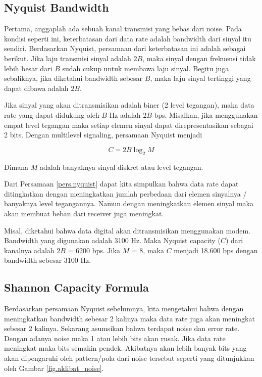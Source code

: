 \subsection{Nyquist Bandwidth}

Pertama, anggaplah ada sebuah kanal transmisi yang bebas dari noise. Pada kondisi seperti ini, keterbatasan dari data rate adalah bandwidth dari sinyal itu sendiri. Berdasarkan Nyquist, persamaan dari keterbatasan ini adalah sebagai berikut. Jika laju transmisi sinyal adalah $ 2B $, maka sinyal dengan frekuensi tidak lebih besar dari $ B $ sudah cukup untuk membawa laju sinyal. Begitu juga sebaliknya, jika diketahui bandwidth sebesar $ B $, maka laju sinyal tertinggi yang dapat dibawa adalah $ 2B $.

Jika sinyal yang akan ditransmisikan adalah biner (2 level tegangan), maka data rate yang dapat didukung oleh $ B $ Hz adalah $ 2B $ bps. Misalkan, jika menggunakan empat level tegangan maka setiap elemen sinyal dapat direpresentasikan sebagai 2 bits. Dengan multilevel signaling, persamaan Nyquist menjadi

\begin{equation} \label{pers.nyquist}
	C = 2B \log_2 M
\end{equation}

Dimana $ M $ adalah banyaknya sinyal diskret atau level tegangan.

Dari Persamaan \ref{pers.nyquist} dapat kita simpulkan bahwa data rate dapat ditingkatkan dengan meningkatkan jumlah perbedaan dari elemen sinyalnya / banyaknya level tegangannya. Namun dengan meningkatkan elemen sinyal maka akan membuat beban dari receiver juga meningkat.

Misal, diketahui bahwa data digital akan ditransmisikan menggunakan modem. Bandwidth yang digunakan adalah 3100 Hz. Maka Nyquist capacity ($ C $) dari kanalnya adalah $ 2B $ = 6200 bps. Jika $ M $ = 8, maka $ C $ menjadi 18.600 bps dengan bandwidth sebesar 3100 Hz.

\subsection{Shannon Capacity Formula}

Berdasarkan persamaan Nyquist sebelumnya, kita mengetahui bahwa dengan meningkatkan bandwidth sebesar 2 kalinya maka data rate juga akan meningkat sebesar 2 kalinya. Sekarang asumsikan bahwa terdapat noise dan error rate. Dengan adanya noise maka 1 atau lebih bits akan rusak. Jika data rate meningkat maka bits semakin pendek. Akibatnya akan lebih banyak bits yang akan dipengaruhi oleh pattern/pola dari noise tersebut seperti yang ditunjukkan oleh Gambar \ref{fig.aklibat_noise}.


